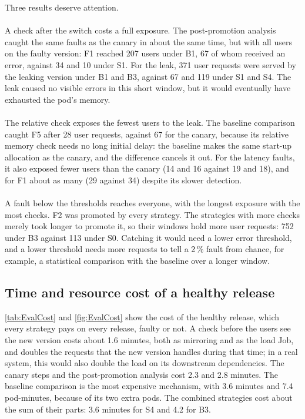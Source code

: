 Three results deserve attention.

\paragraph{} A check after the switch costs a full exposure. The post-promotion analysis caught the same faults as the canary in about the same time, but with all users on the faulty version: F1 reached 207 users under B1, 67 of whom received an error, against 34 and 10 under S1. For the leak, 371 user requests were served by the leaking version under B1 and B3, against 67 and 119 under S1 and S4. The leak caused no visible errors in this short window, but it would eventually have exhausted the pod's memory.

\paragraph{} The relative check exposes the fewest users to the leak. The baseline comparison caught F5 after 28 user requests, against 67 for the canary, because its relative memory check needs no long initial delay: the baseline makes the same start-up allocation as the canary, and the difference cancels it out. For the latency faults, it also exposed fewer users than the canary (14 and 16 against 19 and 18), and for F1 about as many (29 against 34) despite its slower detection.

\paragraph{} A fault below the thresholds reaches everyone, with the longest exposure with the most checks. F2 was promoted by every strategy. The strategies with more checks merely took longer to promote it, so their windows hold more user requests: 752 under B3 against 113 under S0. Catching it would need a lower error threshold, and a lower threshold needs more requests to tell a 2\,\% fault from chance, for example, a statistical comparison with the baseline over a longer window.

\subsection{Time and resource cost of a healthy release}
\label{sec:EvalCost}
\autoref{tab:EvalCost} and \autoref{fig:EvalCost} show the cost of the healthy release, which every strategy pays on every release, faulty or not. A check before the users see the new version costs about 1.6 minutes, both as mirroring and as the load Job, and doubles the requests that the new version handles during that time; in a real system, this would also double the load on its downstream dependencies. The canary steps and the post-promotion analysis cost 2.3 and 2.8 minutes. The baseline comparison is the most expensive mechanism, with 3.6 minutes and 7.4 pod-minutes, because of its two extra pods. The combined strategies cost about the sum of their parts: 3.6 minutes for S4 and 4.2 for B3.


